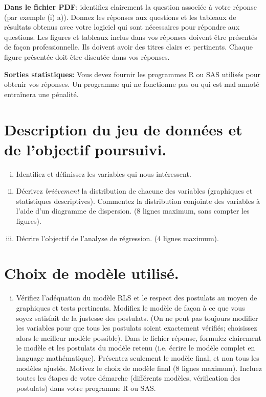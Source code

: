 \begin{questions}
{\bf Dans le fichier PDF}: identifiez clairement la question associée à votre réponse (par exemple (i) a)). Donnez les réponses aux questions et les tableaux de résultats obtenus avec votre logiciel qui sont nécessaires pour
répondre aux questions. Les figures et tableaux inclus dans vos réponses doivent être présentés de façon professionnelle. Ils doivent avoir des titres clairs et pertinents. Chaque figure présentée doit être discutée dans vos réponses. 

\textbf{Sorties statistiques:}
Vous devez fournir les programmes R ou SAS utilisés pour obtenir vos réponses. Un programme qui ne fonctionne pas ou qui est mal annoté entraînera une pénalité. \\


\begin{parts}
	\part[9] {\bf Description du jeu de données et de l'objectif poursuivi.}
\begin{enumerate}[(i)]
\item Identifiez et définissez les variables qui nous intéressent.
\item Décrivez {\it brièvement} la distribution de chacune des variables (graphiques et statistiques descriptives). Commentez la distribution conjointe des variables à l'aide d'un diagramme de dispersion.  (8 lignes maximum, sans compter les figures).
\item Décrire l'objectif de l'analyse de régression. (4 lignes maximum).
\end{enumerate}
	\part[14] {\bf Choix de modèle utilisé.}
\begin{enumerate}[(i)]
	\item Vérifiez l'adéquation du mod\`ele RLS et le respect des postulats au moyen de graphiques et tests pertinents. Modifiez le modèle de façon à ce que vous soyez satisfait de la justesse des postulats. (On ne peut pas toujours modifier les variables pour que tous les postulats soient exactement vérifiés;  choisissez alors le meilleur modèle possible). Dans le fichier réponse, formulez clairement le modèle et les postulats du mod\`ele retenu (i.e. écrire le modèle complet en language mathématique). Présentez seulement le modèle final, et non tous les modèles ajustés. Motivez le choix de modèle final (8 lignes maximum). Incluez toutes les étapes de votre démarche (différents modèles, vérification des postulats) dans votre programme R ou SAS. 
\end{enumerate}

\end{parts}
\end{questions}
